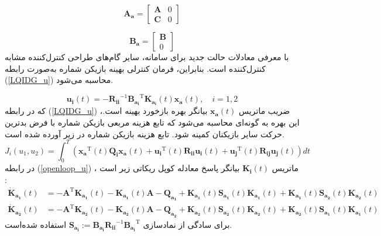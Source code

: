  \begin{equation}
	\boldsymbol{A_a} = \begin{bmatrix}
		\boldsymbol{A} &0\\
		\boldsymbol{C} & 0
	\end{bmatrix}
\end{equation}

\begin{equation}
	\boldsymbol{B_a} = \begin{bmatrix}
		\boldsymbol{B}\\
		0
	\end{bmatrix}
\end{equation}
با معرفی معادلات حالت جدید برای سامانه، سایر گام‌های طراحی کنترل‌کننده
 مشابه کنترل‌کننده
است. بنابراین، فرمان کنترلی بهینه  بازیکن شماره  به‌صورت رابطه
(\ref{LQIDG_u})
محاسبه می‌شود.

\begin{equation}\label{LQIDG_u}
	\boldsymbol{u_i}(t) = -\boldsymbol{R_{ii}}^{-1}\boldsymbol{B_{a_i}}^\mathrm{T}\boldsymbol{K_{a_i}}(t)\boldsymbol{x_a}(t),\quad i = 1, 2
\end{equation}
که در رابطه 
(\ref{LQIDG_u})
،ضریب ماتریس $\boldsymbol{x_a}(t)$ بیانگر بهره بازخورد بهینه است. این بهره به گونه‌ای محاسبه می‌شود که تابع هزینه مربعی بازیکن شماره  با فرض بدترین حرکت سایر بازیکنان کمینه شود. تابع هزینه بازیکن شماره  در زیر آورده شده است.
\begin{equation}
	J_i(u_{1}, u_{2}) = \int_{0}^{T}\left( \boldsymbol{x_a} ^\mathrm{T}(t) \boldsymbol{Q_i} \boldsymbol{x_a}(t)+
	\boldsymbol{u_i} ^\mathrm{T}(t) \boldsymbol{R_{ii}} \boldsymbol{u_i}(t)+
	\boldsymbol{u_j} ^\mathrm{T}(t)\boldsymbol{ R_{ij} u_j}(t)
	\right)dt
\end{equation}
در رابطه 
(\ref{openloop_u})
، ماتریس $\boldsymbol{K_{i}}(t)$ بیانگر پاسخ معادله کوپل ریكاتی
زیر است
\cite{diff_game}:
\begin{equation}\label{coupled_riccatti_LQIDG}
	\begin{split}
		\boldsymbol{\dot{K}_{a_1}}(t) &= -\boldsymbol{A}^\mathrm{T}\boldsymbol{K_{a_1}}(t) - \boldsymbol{K_{a_1}}(t)\boldsymbol{A} - \boldsymbol{Q_{a_1}} +\boldsymbol{K_{a_1}}(t)\boldsymbol{S_{a_1}}(t)\boldsymbol{K_{a_1}}(t) + \boldsymbol{K_{a_1}}(t)\boldsymbol{S_{a_2}}(t)\boldsymbol{K_{a_2}}(t)\\
		\boldsymbol{\dot{K}_{a_2}}(t) &= -\boldsymbol{A}^\mathrm{T}\boldsymbol{K_{a_2}}(t) - \boldsymbol{K_{a_2}}(t)\boldsymbol{A} - \boldsymbol{Q_{a_2}} +\boldsymbol{K_{a_2}}(t)\boldsymbol{S_{a_2}}(t)\boldsymbol{K_{a_2}}(t) + \boldsymbol{K_{a_2}}(t)\boldsymbol{S_{a_1}}(t)\boldsymbol{K_{a_1}}(t)
	\end{split}
\end{equation}
برای سادگی از نمادسازی
$\boldsymbol{S_{a_i}} := \boldsymbol{B_{a_i}R_{ii}}^{-1}\boldsymbol{B_{a_i}}^\mathrm{T}$
استفاده شده‌است. 
 
 
 
 